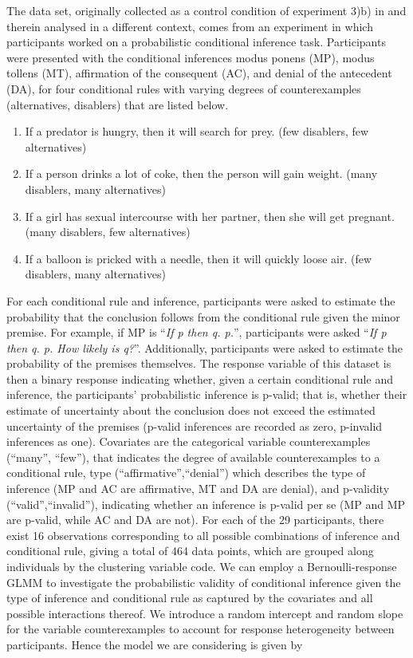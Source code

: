 \documentclass[11pt, a4paper]{article}
\theoremstyle{example} \newtheorem{example}{Example}[section]
\theoremstyle{theorem} \newtheorem{theorem}{Theorem}[section]
\begin{document}
The data set, originally collected as a control condition of experiment 3)b) in \citet{singmann+etal:2016} and therein analysed in a different context, comes from an experiment in which participants worked on a probabilistic conditional inference task. Participants were presented with the conditional inferences modus ponens (MP), modus tollens (MT), affirmation of the consequent (AC), and denial of the antecedent (DA), for four conditional rules with varying degrees of counterexamples (alternatives, disablers) that are listed below.
\begin{enumerate}
	\item If a predator is hungry, then it will search for prey. (few disablers, few alternatives)
	\item If a person drinks a lot of coke, then the person will gain weight. (many disablers, many alternatives)
	\item If a girl has sexual intercourse with her partner, then she will get pregnant. (many disablers, few alternatives)
	\item If a balloon is pricked with a needle, then it will quickly loose air. (few disablers, many alternatives)
\end{enumerate}
For each conditional rule and inference, participants were asked to estimate the probability that the conclusion follows from the conditional rule given the minor premise. For example, if MP is ``\textit{If p then q. p.}'', participants were asked ``\textit{If p then q. p. How likely is q?}''. Additionally, participants were asked to estimate the probability of the premises themselves. The response variable of this dataset is then a binary response indicating whether, given a certain conditional rule and inference, the participants' probabilistic inference is p-valid; that is, whether their estimate of uncertainty about the conclusion does not exceed the estimated uncertainty of the premises (p-valid inferences are recorded as zero, p-invalid inferences as one). Covariates are the categorical variable counterexamples (``many'', ``few''), that indicates the degree of available counterexamples to a conditional rule, type (``affirmative'',``denial'') which describes the type of inference (MP and AC are affirmative, MT and DA are denial), and p-validity (``valid'',``invalid''), indicating whether an inference is p-valid per se (MP and MP are p-valid, while AC and DA are not). For each of the 29 participants, there exist 16 observations corresponding to all possible combinations of inference and conditional rule, giving a total of 464 data points, which are grouped along individuals by the clustering variable code. We can employ a Bernoulli-response GLMM to investigate the probabilistic validity of conditional inference given the type of inference and conditional rule as captured by the covariates and all possible interactions thereof. We introduce a random intercept and random slope for the variable counterexamples to account for response heterogeneity between participants. Hence the model we are considering is given by    
\end{document}
